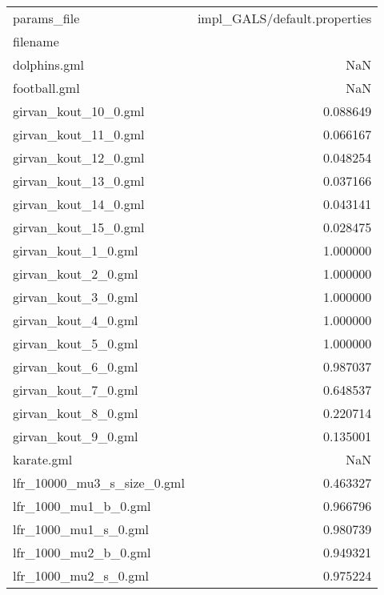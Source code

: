 \begin{tabular}{lr}
\toprule
params\_file &  impl\_GALS/default.properties \\
filename                   &                               \\
\midrule
dolphins.gml               &                           NaN \\
football.gml               &                           NaN \\
girvan\_kout\_10\_0.gml       &                      0.088649 \\
girvan\_kout\_11\_0.gml       &                      0.066167 \\
girvan\_kout\_12\_0.gml       &                      0.048254 \\
girvan\_kout\_13\_0.gml       &                      0.037166 \\
girvan\_kout\_14\_0.gml       &                      0.043141 \\
girvan\_kout\_15\_0.gml       &                      0.028475 \\
girvan\_kout\_1\_0.gml        &                      1.000000 \\
girvan\_kout\_2\_0.gml        &                      1.000000 \\
girvan\_kout\_3\_0.gml        &                      1.000000 \\
girvan\_kout\_4\_0.gml        &                      1.000000 \\
girvan\_kout\_5\_0.gml        &                      1.000000 \\
girvan\_kout\_6\_0.gml        &                      0.987037 \\
girvan\_kout\_7\_0.gml        &                      0.648537 \\
girvan\_kout\_8\_0.gml        &                      0.220714 \\
girvan\_kout\_9\_0.gml        &                      0.135001 \\
karate.gml                 &                           NaN \\
lfr\_10000\_mu3\_s\_size\_0.gml &                      0.463327 \\
lfr\_1000\_mu1\_b\_0.gml       &                      0.966796 \\
lfr\_1000\_mu1\_s\_0.gml       &                      0.980739 \\
lfr\_1000\_mu2\_b\_0.gml       &                      0.949321 \\
lfr\_1000\_mu2\_s\_0.gml       &                      0.975224 \\

\end{tabular}
